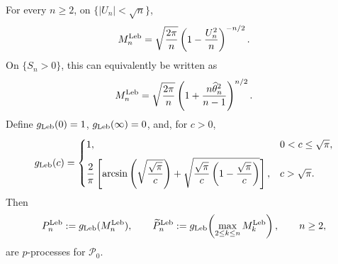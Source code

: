 \begin{proposition}
\label{thm:Mn-Leb}
For every \(n\geq2\), on \(\{|U_n|<\sqrt n\}\),
\begin{equation}
\label{eq:Mn-Leb}
  M_n^{\mathrm{Leb}}
  =
  \sqrt{\frac{2\pi}{n}}
  \left(1-\frac{U_n^2}{n}\right)^{-n/2}.
\end{equation}
On \(\{S_n>0\}\), this can equivalently be written as
\[
  M_n^{\mathrm{Leb}}
  =
  \sqrt{\frac{2\pi}{n}}
  \left(
    1+\frac{n\widehat\theta_n^2}{n-1}
  \right)^{n/2}.
\]
Define \(g_{\mathrm{Leb}}(0)=1\), \(g_{\mathrm{Leb}}(\infty)=0\), and, for \(c>0\),
\begin{equation}
\label{eq:g-Leb}
  g_{\mathrm{Leb}}(c)
  =
  \begin{cases}
    1,
    &0<c\leq\sqrt\pi,
    \\[6pt]
    \displaystyle
    \frac{2}{\pi}
    \left[
      \arcsin\left(
        \sqrt{\frac{\sqrt\pi}{c}}
      \right)
      +
      \sqrt{
        \frac{\sqrt\pi}{c}
        \left(1-\frac{\sqrt\pi}{c}\right)
      }
    \right],
    &c>\sqrt\pi.
  \end{cases}
\end{equation}
Then
\[
  P_n^{\mathrm{Leb}}
  :=
  g_{\mathrm{Leb}}(M_n^{\mathrm{Leb}}),
  \qquad
  \widetilde P_n^{\mathrm{Leb}}
  :=
  g_{\mathrm{Leb}}\!\left(\max_{2\leq k\leq n}M_k^{\mathrm{Leb}}\right),
  \qquad n\geq2,
\]
are \(p\)-processes for \(\mathcal P_0\).
\end{proposition}